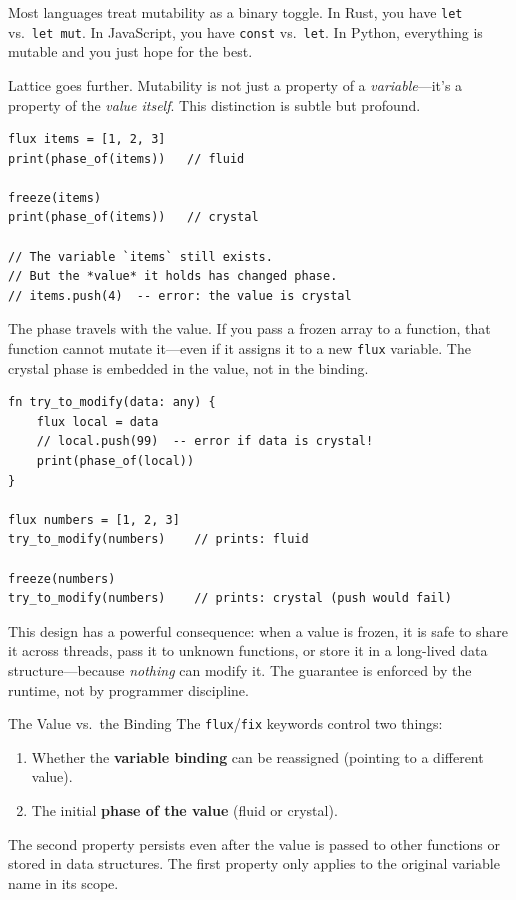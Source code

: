 Most languages treat mutability as a binary toggle.
In Rust, you have \lstinline|let| vs.\ \lstinline|let mut|.
In JavaScript, you have \lstinline|const| vs.\ \lstinline|let|.
In Python, everything is mutable and you just hope for the best.

Lattice goes further.
Mutability is not just a property of a \emph{variable}---it's a property of the \emph{value itself}.
This distinction is subtle but profound.

\begin{lstlisting}[language=Lattice, caption={Phase is a property of the value, not the variable}]
flux items = [1, 2, 3]
print(phase_of(items))   // fluid

freeze(items)
print(phase_of(items))   // crystal

// The variable `items` still exists.
// But the *value* it holds has changed phase.
// items.push(4)  -- error: the value is crystal
\end{lstlisting}

The phase travels with the value.
If you pass a frozen array to a function, that function cannot mutate it---even if it assigns it to a new \lstinline|flux| variable.
The crystal phase is embedded in the value, not in the binding.

\begin{lstlisting}[language=Lattice, caption={Phase follows the value through function calls}]
fn try_to_modify(data: any) {
    flux local = data
    // local.push(99)  -- error if data is crystal!
    print(phase_of(local))
}

flux numbers = [1, 2, 3]
try_to_modify(numbers)    // prints: fluid

freeze(numbers)
try_to_modify(numbers)    // prints: crystal (push would fail)
\end{lstlisting}

This design has a powerful consequence: when a value is frozen, it is safe to share it across threads, pass it to unknown functions, or store it in a long-lived data structure---because \emph{nothing} can modify it.
The guarantee is enforced by the runtime, not by programmer discipline.

\begin{notebox}{The Value vs.\ the Binding}
The \lstinline|flux|/\lstinline|fix| keywords control two things:
\begin{enumerate}
  \item Whether the \textbf{variable binding} can be reassigned (pointing to a different value).
  \item The initial \textbf{phase of the value} (fluid or crystal).
\end{enumerate}
The second property persists even after the value is passed to other functions or stored in data structures.
The first property only applies to the original variable name in its scope.
\end{notebox}

